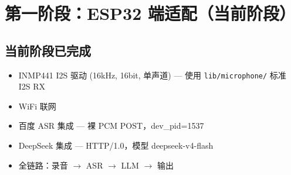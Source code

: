 \documentclass[12pt,a4paper,openany]{ctexbook}
\newcommand{\taskdone}{{\color{success}$\blacksquare$}}
\begin{document}
\section{第一阶段：ESP32 端适配（当前阶段）}

\subsection*{当前阶段已完成}
\begin{itemize}
    \item[\taskdone] INMP441 I2S 驱动 (16kHz, 16bit, 单声道) — 使用 \texttt{lib/microphone/} 标准 I2S RX
    \item[\taskdone] WiFi 联网
    \item[\taskdone] 百度 ASR 集成 — 裸 PCM POST，dev\_pid=1537
    \item[\taskdone] DeepSeek 集成 — HTTP/1.0，模型 deepseek-v4-flash
    \item[\taskdone] 全链路：录音 $\to$ ASR $\to$ LLM $\to$ 输出
\end{itemize}
\end{document}
